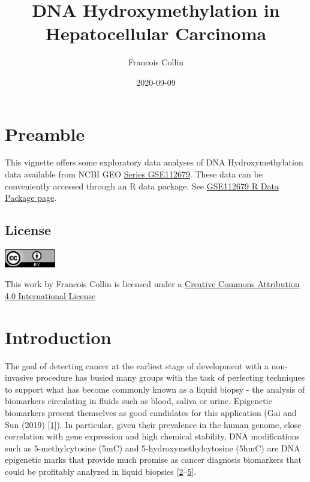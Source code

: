 \documentclass[
]{book}
\title{DNA Hydroxymethylation in Hepatocellular Carcinoma}
\author{Francois Collin}
\date{2020-09-09}
\begin{document}
\maketitle

{
\setcounter{tocdepth}{1}
\tableofcontents
}
\hypertarget{index}{%
\chapter*{Preamble}\label{index}}

This vignette offers some exploratory data analyses of
DNA Hydroxymethylation data available from
NCBI GEO \href{https://www.ncbi.nlm.nih.gov/geo/query/acc.cgi?acc=GSE112679}{Series GSE112679}.
These data can be conveniently accessed through an R data package.
See \href{https://12379monty.github.io/GSE112679/}{GSE112679 R Data Package page}.

\hypertarget{license}{%
\section*{License}\label{license}}

\includegraphics[width=0.88in]{Static/images/CC_4_0}

This work by Francois Collin is licensed under a
\href{http://creativecommons.org/licenses/by/4.0/}{Creative Commons Attribution 4.0 International License}

\hypertarget{intro}{%
\chapter{Introduction}\label{intro}}

The goal of detecting
cancer at the earliest stage of development with a non-invasive procedure
has busied many groups with the task of perfecting techniques to support
what has become commonly known as a
liquid biopsy - the analysis of biomarkers circulating in fluids such as blood,
saliva or urine. Epigenetic biomarkers present themselves as good candidates for this application
(Gai and Sun (2019) {[}\protect\hyperlink{ref-Gai:2019aa}{1}{]}). In particular,
given their prevalence in the human genome,
close correlation with gene expression and high chemical stability,
DNA modifications such as 5-methylcytosine (5mC) and 5-hydroxymethylcytosine (5hmC)
are DNA epigenetic marks that provide much promise as
cancer diagnosis biomarkers that could be profitably analyzed in liquid biopsies
{[}\protect\hyperlink{ref-Cai:2019aa}{2}--\protect\hyperlink{ref-Collin:2018aa}{5}{]}.
\end{document}
